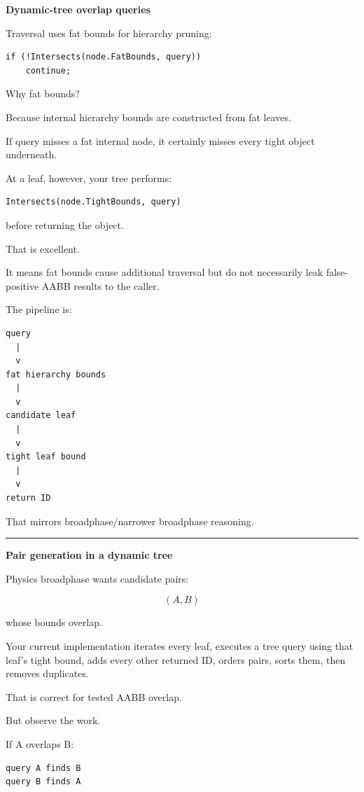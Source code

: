 \textbf{Dynamic-tree overlap queries}

Traversal uses fat bounds for hierarchy pruning:

\begin{verbatim}
if (!Intersects(node.FatBounds, query))
    continue;
\end{verbatim}

Why fat bounds?

Because internal hierarchy bounds are constructed from fat leaves.

If query misses a fat internal node, it certainly misses every tight object underneath.

At a leaf, however, your tree performs:

\begin{verbatim}
Intersects(node.TightBounds, query)
\end{verbatim}

before returning the object.

That is excellent.

It means fat bounds cause additional traversal but do not necessarily leak false-positive AABB results to the caller.

The pipeline is:

\begin{verbatim}
query
  |
  v
fat hierarchy bounds
  |
  v
candidate leaf
  |
  v
tight leaf bound
  |
  v
return ID
\end{verbatim}

That mirrors broadphase/narrower broadphase reasoning.

\begin{center}\rule{0.5\linewidth}{0.5pt}\end{center}

\textbf{Pair generation in a dynamic tree}

Physics broadphase wants candidate pairs:

\[
(A,B)
\]

whose bounds overlap.

Your current implementation iterates every leaf, executes a tree query using that leaf's tight bound, adds every other returned ID, orders pairs, sorts them, then removes duplicates.

That is correct for tested AABB overlap.

But observe the work.

If A overlaps B:

\begin{verbatim}
query A finds B
query B finds A
\end{verbatim}

